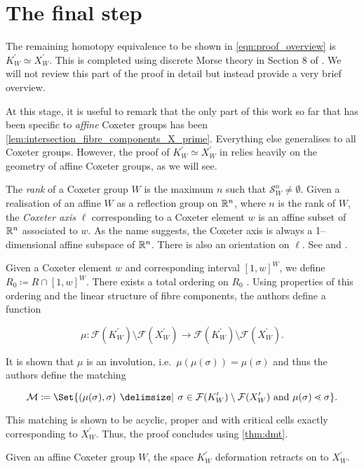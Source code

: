 \documentclass[class=article, crop=false]{standalone}
\begin{document}
\section{The final step}
The remaining homotopy equivalence to be shown in \eqref{eqn:proof_overview} is $K^\prime_W \simeq X^\prime_W$. This is completed using discrete Morse theory in Section 8 of \cite{paolini_salvetti_kpi1_2021}. We will not review this part of the proof in detail but instead provide a very brief overview.

At this stage, it is useful to remark that the only part of this work so far that has been specific to \emph{affine} Coxeter groups has been \cref{lem:intersection_fibre_components_X_prime}. Everything else generalises to all Coxeter groups. However, the proof of $K_W^\prime \simeq X^\prime_W$ in \cite{paolini_salvetti_kpi1_2021} relies heavily on the geometry of affine Coxeter groups, as we will see.

The \emph{rank} of a Coxeter group $W$ is the maximum $n$ such that $\mathcal{S}^n_W \neq \emptyset$. Given a realisation of an affine $W$ as a reflection group on $\mathbb{R}^n$, where $n$ is the rank of $W$, the \emph{Coxeter axis} $\ell$ corresponding to a Coxeter element $w$ is an affine subset of $\mathbb{R}^n$ associated to $w$. As the name suggests, the Coxeter axis is always a 1--dimensional affine subspace of $\mathbb{R}^n$. There is also an orientation on $\ell$. See \cite[Section 4]{paolini_salvetti_kpi1_2021} and \cite[Section 7]{mccammond_dual_2015}.

Given a Coxeter element $w$ and corresponding interval $[1,w]^W$, we define $R_0 \coloneq R \cap [1,w]^W$. There exists a total ordering on $R_0$ \cite[Definition 4.10]{paolini_salvetti_kpi1_2021}. Using properties of this ordering and the linear structure of fibre components, the authors define a function 

\begin{equation*}
    \mu \colon \mathcal{F}(K_W^\prime)\setminus\mathcal{F}(X_W^\prime) \to \mathcal{F}(K_W^\prime)\setminus\mathcal{F}(X_W^\prime) .
\end{equation*}

It is shown that $\mu$ is an involution, i.e.~$\mu(\mu(\sigma)) = \mu(\sigma)$ and thus the authors define the matching

\begin{equation*}
    \mathcal{M} \coloneq \Set{(\mu(\sigma), \sigma) \given \sigma \in \mathcal{F}(K_W^\prime)\setminus\mathcal{F}(X_W^\prime) \text{ and } \mu(\sigma) \lessdot \sigma}.
\end{equation*}

This matching is shown to be acyclic, proper and with critical cells exactly corresponding to $X_W^\prime$. Thus, the proof concludes using \cref{thm:dmt}.

\begin{theorem}
    Given an affine Coxeter group $W$, the space $K^\prime_W$ deformation retracts on to $X^\prime_W$.
    \label{thm:K_prime_hom_equiv_X_prime}
\end{theorem}
\end{document}
